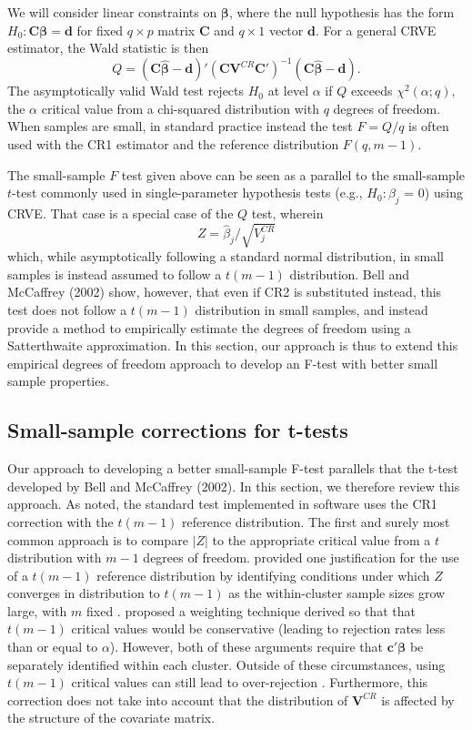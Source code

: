 \documentclass[12pt]{article}
\newcommand{\bm}{\mathbf}
\newcommand{\bs}{\boldsymbol}
\begin{document}
We will consider linear constraints on $\bs\beta$, where the null hypothesis has the form $H_0: \bm{C}\bs\beta = \bm{d}$ for fixed $q \times p$ matrix $\bm{C}$ and $q \times 1$ vector $\bm{d}$. 
For a general CRVE estimator, the Wald statistic  is then \[
Q = \left(\bm{C}\bs{\hat\beta} - \bm{d}\right)'\left(\bm{C} \bm{V}^{CR} \bm{C}'\right)^{-1}\left(\bm{C}\bs{\hat\beta} - \bm{d}\right).
\]
The asymptotically valid Wald test rejects $H_0$ at level $\alpha$ if $Q$ exceeds $\chi^2(\alpha; q)$, the $\alpha$ critical value from a chi-squared distribution with $q$ degrees of freedom.  When samples are small, in standard practice instead the test $F = Q/q$ is often used with the CR1 estimator and the reference distribution $F(q, m - 1)$. 

The small-sample $F$ test given above can be seen as a parallel to the small-sample $t$-test commonly used in single-parameter hypothesis tests (e.g., $H_0: \beta_j$ = 0) using CRVE. That case is a special case of the $Q$ test, wherein \[
Z = \hat\beta_j/\sqrt{V_j^{CR}} 
\]
which, while asymptotically following a standard normal distribution, in small samples is instead assumed to follow a $t(m - 1)$ distribution. 
Bell and McCaffrey (2002) show, however, that even if CR2 is substituted instead, this test does not follow a $t(m - 1)$ distribution in small samples, and instead provide a method to empirically estimate the degrees of freedom using a Satterthwaite approximation. 
In this section, our approach is thus to extend this empirical degrees of freedom approach to develop an F-test with better small sample properties.

\subsection{Small-sample corrections for t-tests}
Our approach to developing a better small-sample F-test parallels that the t-test developed by Bell and McCaffrey (2002). 
In this section, we therefore review this approach. As noted, the standard test implemented in software uses the CR1 correction with the $t(m - 1)$ reference distribution. 
The first and surely most common approach is to compare $|Z|$ to the appropriate critical value from a $t$ distribution with $m - 1$ degrees of freedom. 
\citet{Hansen2007asymptotic} provided one justification for the use of a $t(m-1)$ reference distribution by identifying conditions under which $Z$ converges in distribution to $t(m-1)$ as the within-cluster sample sizes grow large, with $m$ fixed \citep[see also][]{Donald2007inference}. 
\citet{Ibragimov2010tstatistic} proposed a weighting technique derived so that that $t(m-1)$ critical values would be conservative (leading to rejection rates less than or equal to $\alpha$).
However, both of these arguments require that $\bm{c}'\bs\beta$ be separately identified within each cluster. 
Outside of these circumstances, using $t(m-1)$ critical values can still lead to over-rejection \citep{Cameron2015practitioners}. 
Furthermore, this correction does not take into account that the distribution of $\bm{V}^{CR}$ is affected by the structure of the covariate matrix. 
\end{document}
